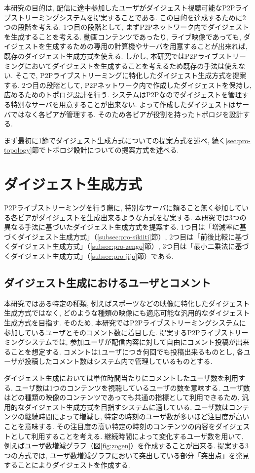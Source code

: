 本研究の目的は, 配信に途中参加したユーザがダイジェスト視聴可能なP2Pライブストリーミングシステムを提案することである. この目的を達成するために2つの段階を考える. 1つ目の段階として, まずP2Pネットワーク内でダイジェストを生成することを考える. 動画コンテンツであったり, ライブ映像であっても, ダイジェストを生成するための専用の計算機やサーバを用意することが出来れば, 既存のダイジェスト生成方式を使える. しかし, 本研究ではP2Pライブストリーミングにおいてダイジェストを生成することを考えるため既存の手法は使えない. そこで, P2Pライブストリーミングに特化したダイジェスト生成方式を提案する. 2つ目の段階として, P2Pネットワーク内で作成したダイジェストを保持し, 広めるためのトポロジ設計を行う. システムはP2Pなのでダイジェストを管理する特別なサーバを用意することが出来ない. よって作成したダイジェストはサーバではなく各ピアが管理する. そのため各ピアが役割を持ったトポロジを設計する.

まず最初に\ref{sec:pro-digest}節でダイジェスト生成方式についての提案方式を述べ, 続く\ref{sec:pro-topology}節でトポロジ設計についての提案方式を述べる.

\newpage

\section{ダイジェスト生成方式}\label{sec:pro-digest}
P2Pライブストリーミングを行う際に, 特別なサーバに頼ること無く参加している各ピアがダイジェストを生成出来るような方式を提案する. 本研究では3つの異なる手法に基づいたダイジェスト生成方式を提案する. 1つ目は「増減率に基づくダイジェスト生成方式」（\ref{subsec:pro-sikiiti}節）, 2つ目は「前後比較に基づくダイジェスト生成方式」（\ref{subsec:pro-zengo}節）, 3つ目は「最小二乗法に基づくダイジェスト生成方式」（\ref{subsec:pro-jijo}節）である.

\subsection{ダイジェスト生成におけるユーザとコメント}
本研究ではある特定の種類, 例えばスポーツなどの映像に特化したダイジェスト生成方式ではなく, どのような種類の映像にも適応可能な汎用的なダイジェスト生成方式を目指す. そのため, 本研究ではP2Pライブストリーミングシステムに参加しているユーザとそのコメント数に着目した. 提案するP2Pライブストリーミングシステムでは, 参加ユーザが配信内容に対して自由にコメント投稿が出来ることを想定する. コメントは1ユーザにつき何回でも投稿出来るものとし, 各ユーザが投稿したコメント数はシステム内で管理しているものとする.

ダイジェスト生成においては単位時間当たりにコメントしたユーザ数を利用する. ユーザ数は1つのコンテンツを視聴しているユーザの数を意味する. ユーザ数はどの種類の映像のコンテンツであっても共通の指標として利用できるため, 汎用的なダイジェスト生成方式を目指すシステムに適している. ユーザ数はコンテンツの継続時間によって増減し, 特定の時刻のユーザ数が多いほど注目度が高いことを意味する. その注目度の高い特定の時刻のコンテンツの内容をダイジェストとして利用することを考える. 継続時間によって変化するユーザ数を用いて, 例えばユーザ数増減グラフ（図\ref{fig:zogen}）を作成することが出来る. 提案する3つの方式では, ユーザ数増減グラフにおいて突出している部分「突出点」を発見することによりダイジェストを作成する.

